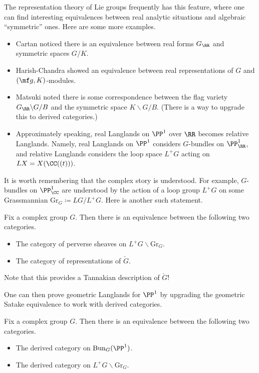 \documentclass{article}
\begin{document}
The representation theory of Lie groups frequently has this feature, where one can find interesting equivalences between real analytic situations and algebraic ``symmetric'' ones. Here are some more examples.
\begin{itemize}
	\item Cartan noticed there is an equivalence between real forms $G_\RR$ and symmetric spaces $G/K$.
	\item Harish-Chandra showed an equivalence between real representations of $G$ and $(\mf g,K)$-modules.
	\item Matsuki noted there is some correspondence between the flag variety $G_\RR\backslash G/B$ and the symmetric space $K\backslash G/B$. (There is a way to upgrade this to derived categories.)
	\item Approximately speaking, real Langlands on $\PP^1$ over $\RR$ becomes relative Langlands. Namely, real Langlands on $\PP^1$ considers $G$-bundles on $\PP^1_\RR$, and relative Langlands considers the loop space $L^+G$ acting on $LX=X(\CC((t)))$.
\end{itemize}
It is worth remembering that the complex story is understood. For example, $G$-bundles on $\PP^1_\CC$ are understood by the action of a loop group $L^+G$ on some Grassmannian $\mathrm{Gr}_G\coloneqq LG/L^+G$. Here is another such statement.
\begin{theorem}
	Fix a complex group $G$. Then there is an equivalence between the following two categories.
	\begin{itemize}
		\item The category of perverse sheaves on $L^+G\backslash\mathrm{Gr}_G$.
		\item The category of representations of $\check G$.
	\end{itemize}
\end{theorem}
\begin{remark}
	Note that this provides a Tannakian description of $\check G$!
\end{remark}
One can then prove geometric Langlands for $\PP^1$ by upgrading the geometric Satake equivalence to work with derived categories.
\begin{theorem}
	Fix a complex group $G$. Then there is an equivalence between the following two categories.
	\begin{itemize}
		\item The derived category on $\mathrm{Bun}_G(\PP^1)$.
		\item The derived category on $L^+G\backslash\mathrm{Gr}_G$.
	\end{itemize}
\end{theorem}
\end{document}
